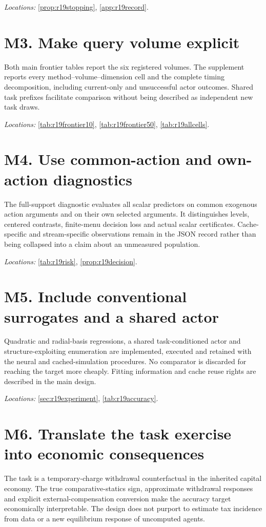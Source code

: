 \documentclass[ecta,nameyear,draft]{econsocart}
\theoremstyle{definition}
\theoremstyle{remark}
\begin{document}
\noindent\emph{Locations:} \ref{prop:r19stopping}, \ref{app:r19record}.

\section*{M3. Make query volume explicit}
Both main frontier tables report the six registered volumes. The supplement reports every method--volume--dimension cell and the complete timing decomposition, including current-only and unsuccessful actor outcomes. Shared task prefixes facilitate comparison without being described as independent new task draws.

\noindent\emph{Locations:} \ref{tab:r19frontier10}, \ref{tab:r19frontier50}, \ref{tab:r19allcells}.

\section*{M4. Use common-action and own-action diagnostics}
The full-support diagnostic evaluates all scalar predictors on common exogenous action arguments and on their own selected arguments. It distinguishes levels, centered contrasts, finite-menu decision loss and actual scalar certificates. Cache-specific and stream-specific observations remain in the JSON record rather than being collapsed into a claim about an unmeasured population.

\noindent\emph{Locations:} \ref{tab:r19risk}, \ref{prop:r19decision}.

\section*{M5. Include conventional surrogates and a shared actor}
Quadratic and radial-basis regressions, a shared task-conditioned actor and structure-exploiting enumeration are implemented, executed and retained with the neural and cached-simulation procedures. No comparator is discarded for reaching the target more cheaply. Fitting information and cache reuse rights are described in the main design.

\noindent\emph{Locations:} \ref{sec:r19experiment}, \ref{tab:r19accuracy}.

\section*{M6. Translate the task exercise into economic consequences}
The task is a temporary-charge withdrawal counterfactual in the inherited capital economy. The true comparative-statics sign, approximate withdrawal responses and explicit external-compensation conversion make the accuracy target economically interpretable. The design does not purport to estimate tax incidence from data or a new equilibrium response of uncomputed agents.
\end{document}

